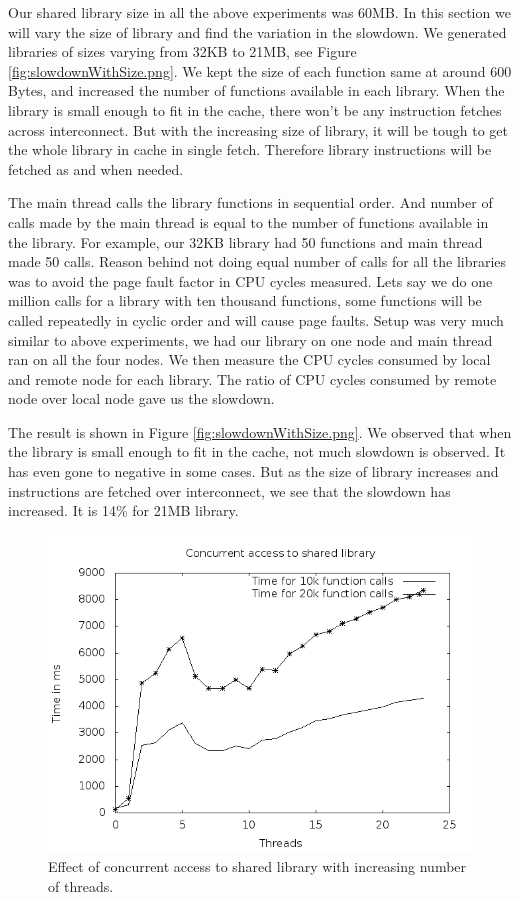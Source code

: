 Our shared library size in all the above experiments was 60MB.
In this section we will vary the size of library and find the variation in the slowdown.
We generated libraries of sizes varying from 32KB to 21MB, see Figure \ref{fig:slowdownWithSize.png}.
We kept the size of each function same at around 600 Bytes, and increased the number of functions available in each library.
When the library is small enough to fit in the cache, there won't be any instruction fetches across interconnect.
But with the increasing size of library, it will be tough to get the whole library in cache in single fetch.
Therefore library instructions will be fetched as and when needed.

The main thread calls the library functions in sequential order.
And number of calls made by the main thread is equal to the number of functions available in the library.
For example, our 32KB library had 50 functions and main thread made 50 calls.
Reason behind not doing equal number of calls for all the libraries was to avoid the page fault factor in CPU cycles measured.
Lets say we do one million calls for a library with ten thousand functions, some functions will be called repeatedly in cyclic order and will cause page faults.
Setup was very much similar to above experiments, we had our library on one node and main thread ran on all the four nodes.
We then measure the CPU cycles consumed by local and remote node for each library.
The ratio of CPU cycles consumed by remote node over local node gave us the slowdown.

The result is shown in Figure \ref{fig:slowdownWithSize.png}.
We observed that when the library is small enough to fit in the cache, not much slowdown is observed.
It has even gone to negative in some cases.
But as the size of library increases and instructions are fetched over interconnect, we see that the slowdown has increased.
It is 14\% for 21MB library.




\begin{figure}
    \centering
    \includegraphics[scale=0.39]{timevsthread.png}
    \caption{Effect of concurrent access to shared library with increasing number of threads. }
    \label{fig:timevsthread.png}
\end{figure}

